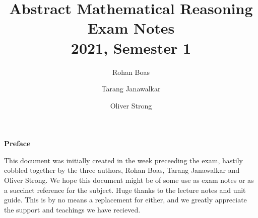 \documentclass{article}
\title{\textbf{Abstract Mathematical Reasoning}
    \texorpdfstring{\\}{ } {\large Exam Notes}
    \texorpdfstring{\\}{ } {\normalsize 2021, Semester 1}}
\author{
    Rohan Boas \and Tarang Janawalkar \and Oliver Strong
}
\date{}
\theoremstyle{plain}
\numberwithin{theorem}{subsection}
\theoremstyle{definition}
\numberwithin{definition}{subsection}
\theoremstyle{remark}
\numberwithin{note}{subsection}
\begin{document}
\begin{titlepage}
\maketitle
\thispagestyle{empty}
\vfill
\begin{adjustwidth}{4cm}{4cm}
{\large\bf Preface}

This document was initially created in the week preceeding the exam,
hastily cobbled together by the three authors, Rohan Boas, Tarang Janawalkar and Oliver Strong.
We hope this document might be of some use as
exam notes or as a succinct reference for the subject.
Huge thanks to the lecture notes and unit guide.
This is by no means a replacement for either,
and we greatly appreciate the support and teachings we have recieved.
\end{adjustwidth}
\vfill
\begin{adjustwidth}{5cm}{5cm}
\doclicenseThis
\end{adjustwidth}
\vfill
\end{titlepage}

\newpage
\end{document}

